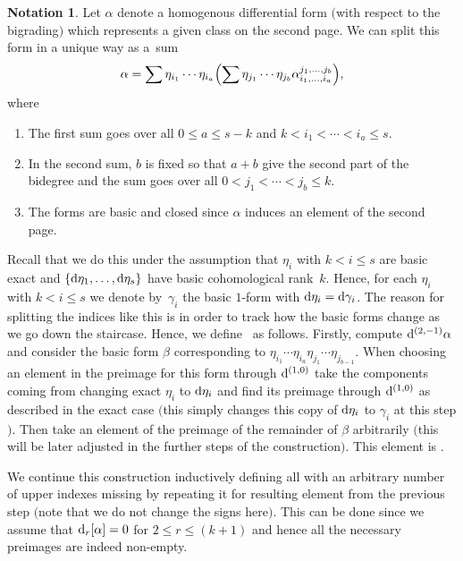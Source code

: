 \documentclass[10pt,a4paper]{amsart}
\numberwithin{equation}{section}
\theoremstyle{definition}
\newtheorem{Not}[tw]{Notation}
\begin{document}
\begin{Not} Let $\alpha$ denote a homogenous differential form $($with respect to the bigrading$)$ which represents a given class on the second page. We can split this form in a unique way as a~sum
\[\alpha=\sum \eta_{i_1}\cdots \eta_{i_a}\Bigl(\sum \eta_{j_1}\cdots \eta_{j_b}\alpha_{i_1,\dots,i_a}^{j_1,\dots,j_b}\Bigr),\]
where
\begin{enumerate}\itemsep=0pt
\item[$1.$] The first sum goes over all $0 \leq a\leq s-k$ and $k<i_1<\cdots <i_a\leq s$.
\item[$2.$] In the second sum, $b$ is fixed so that $a+b$ give the second part of the bidegree and the sum goes over all $0<j_1<\cdots <j_b\leq k$.
\item[$3.$] The forms  are basic and closed since $\alpha$ induces an element of the second page.
\end{enumerate}
Recall that we do this under the assumption that $\eta_{i}$ with $k<i\leq s$ are basic exact and $\{{\rm d}\eta_1,\dots,{\rm d}\eta_s\}$ have basic cohomological rank~$k$. Hence, for each $\eta_i$ with $k<i\leq s$ we denote by~$\gamma_i$ the basic $1$-form with ${\rm d}\eta_i={\rm d}\gamma_i$. The reason for splitting the indices like this is in order to track how the basic forms change as we go down the staircase. Hence, we define~ as follows. Firstly, compute ${\rm d}^{(2,-1)}\alpha$ and consider the basic form $\beta$ corresponding to $\eta_{i_1}\cdots \eta_{i_a}\eta_{j_1}\cdots \eta_{j_{b-1}}$. When choosing an element in the preimage for this form through ${\rm d}^{(1,0)}$ take the components coming from changing exact $\eta_i$ to ${\rm d}\eta_i$ and find its preimage through ${\rm d}^{(1,0)}$ as described in the exact case $($this simply changes this copy of ${\rm d}\eta_i$ to $\gamma_i$ at this step$)$. Then take an element of the preimage of the remainder of $\beta$ arbitrarily $($this will be later adjusted in the further steps of the construction$)$. This element is .

 We continue this construction inductively defining all  with an arbitrary number of upper indexes missing by repeating it for resulting element from the previous step $($note that we do not change the signs here$)$. This can be done since we assume that ${\rm d}_r[\alpha]=0$ for $2\leq r\leq (k+1)$ and hence all the necessary preimages are indeed non-empty.
\end{Not}
\end{document}
